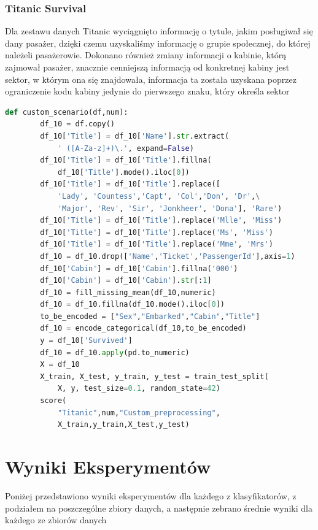 \documentclass{book}
\begin{document}
\subsection{Titanic Survival}
Dla zestawu danych Titanic wyciągnięto informację o tytule, 
jakim posługiwał się dany pasażer, dzięki czemu uzyskaliśmy 
informację o grupie społecznej, do której należeli pasażerowie. 
Dokonano również zmiany informacji o kabinie, którą zajmował pasażer, 
znacznie cenniejszą informacją od konkretnej kabiny jest sektor, 
w którym ona się znajdowała, informacja ta została uzyskana poprzez 
ograniczenie kodu kabiny jedynie do pierwszego znaku, który 
określa sektor

\begin{lstlisting}[language=Python, caption={Usuwanie 
    wartości odstających}, captionpos=b]
    def custom_scenario(df,num):
        df_10 = df.copy()
        df_10['Title'] = df_10['Name'].str.extract(
            ' ([A-Za-z]+)\.', expand=False)
        df_10['Title'] = df_10['Title'].fillna(
            df_10['Title'].mode().iloc[0])
        df_10['Title'] = df_10['Title'].replace([
            'Lady', 'Countess','Capt', 'Col','Don', 'Dr',\
            'Major', 'Rev', 'Sir', 'Jonkheer', 'Dona'], 'Rare')
        df_10['Title'] = df_10['Title'].replace('Mlle', 'Miss')
        df_10['Title'] = df_10['Title'].replace('Ms', 'Miss')
        df_10['Title'] = df_10['Title'].replace('Mme', 'Mrs')
        df_10 = df_10.drop(['Name','Ticket','PassengerId'],axis=1)
        df_10['Cabin'] = df_10['Cabin'].fillna('000')
        df_10['Cabin'] = df_10['Cabin'].str[:1]
        df_10 = fill_missing_mean(df_10,numeric)
        df_10 = df_10.fillna(df_10.mode().iloc[0])
        to_be_encoded = ["Sex","Embarked","Cabin","Title"]
        df_10 = encode_categorical(df_10,to_be_encoded)
        y = df_10['Survived']
        df_10 = df_10.apply(pd.to_numeric)
        X = df_10
        X_train, X_test, y_train, y_test = train_test_split(
            X, y, test_size=0.1, random_state=42)
        score(
            "Titanic",num,"Custom_preprocessing",
            X_train,y_train,X_test,y_test)
\end{lstlisting}

\chapter{Wyniki Eksperymentów}

Poniżej przedstawiono wyniki eksperymentów dla każdego z klasyfikatorów, 
z podziałem na poszczególne zbiory danych, a następnie zebrano średnie wyniki dla każdego 
ze zbiorów danych
\end{document}
